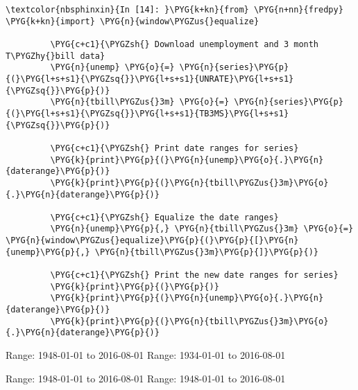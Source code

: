 \documentclass[letterpaper,10pt,openany,oneside,english]{sphinxmanual}
\begin{document}
\begin{Verbatim}[commandchars=\\\{\}]
\textcolor{nbsphinxin}{In [14]: }\PYG{k+kn}{from} \PYG{n+nn}{fredpy} \PYG{k+kn}{import} \PYG{n}{window\PYGZus{}equalize}
         
         \PYG{c+c1}{\PYGZsh{} Download unemployment and 3 month T\PYGZhy{}bill data}
         \PYG{n}{unemp} \PYG{o}{=} \PYG{n}{series}\PYG{p}{(}\PYG{l+s+s1}{\PYGZsq{}}\PYG{l+s+s1}{UNRATE}\PYG{l+s+s1}{\PYGZsq{}}\PYG{p}{)}
         \PYG{n}{tbill\PYGZus{}3m} \PYG{o}{=} \PYG{n}{series}\PYG{p}{(}\PYG{l+s+s1}{\PYGZsq{}}\PYG{l+s+s1}{TB3MS}\PYG{l+s+s1}{\PYGZsq{}}\PYG{p}{)}
         
         \PYG{c+c1}{\PYGZsh{} Print date ranges for series}
         \PYG{k}{print}\PYG{p}{(}\PYG{n}{unemp}\PYG{o}{.}\PYG{n}{daterange}\PYG{p}{)}
         \PYG{k}{print}\PYG{p}{(}\PYG{n}{tbill\PYGZus{}3m}\PYG{o}{.}\PYG{n}{daterange}\PYG{p}{)}
         
         \PYG{c+c1}{\PYGZsh{} Equalize the date ranges}
         \PYG{n}{unemp}\PYG{p}{,} \PYG{n}{tbill\PYGZus{}3m} \PYG{o}{=} \PYG{n}{window\PYGZus{}equalize}\PYG{p}{(}\PYG{p}{[}\PYG{n}{unemp}\PYG{p}{,} \PYG{n}{tbill\PYGZus{}3m}\PYG{p}{]}\PYG{p}{)}
         
         \PYG{c+c1}{\PYGZsh{} Print the new date ranges for series}
         \PYG{k}{print}\PYG{p}{(}\PYG{p}{)}
         \PYG{k}{print}\PYG{p}{(}\PYG{n}{unemp}\PYG{o}{.}\PYG{n}{daterange}\PYG{p}{)}
         \PYG{k}{print}\PYG{p}{(}\PYG{n}{tbill\PYGZus{}3m}\PYG{o}{.}\PYG{n}{daterange}\PYG{p}{)}
\end{Verbatim}
\begin{OriginalVerbatim}[commandchars=\\\{\}]
Range: 1948-01-01 to 2016-08-01
Range: 1934-01-01 to 2016-08-01

Range: 1948-01-01 to 2016-08-01
Range: 1948-01-01 to 2016-08-01
\end{OriginalVerbatim}
\end{document}

